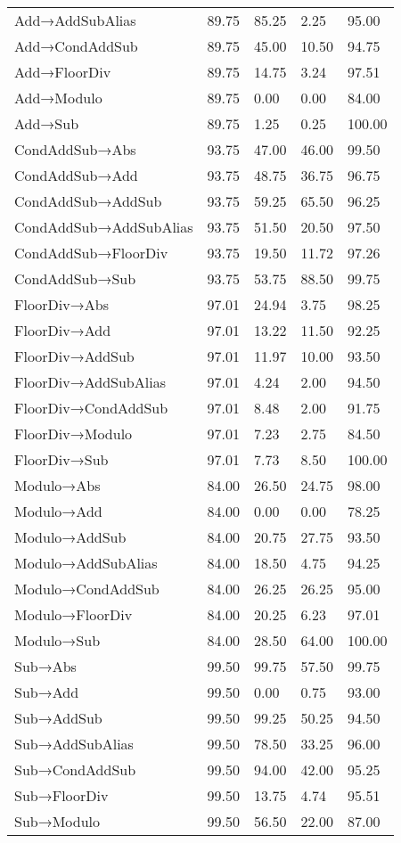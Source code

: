\begin{longtable}{lllll}
Add→AddSubAlias & 89.75 & 85.25 & 2.25 & 95.00 \\
Add→CondAddSub & 89.75 & 45.00 & 10.50 & 94.75 \\
Add→FloorDiv & 89.75 & 14.75 & 3.24 & 97.51 \\
Add→Modulo & 89.75 & 0.00 & 0.00 & 84.00 \\
Add→Sub & 89.75 & 1.25 & 0.25 & 100.00 \\
CondAddSub→Abs & 93.75 & 47.00 & 46.00 & 99.50 \\
CondAddSub→Add & 93.75 & 48.75 & 36.75 & 96.75 \\
CondAddSub→AddSub & 93.75 & 59.25 & 65.50 & 96.25 \\
CondAddSub→AddSubAlias & 93.75 & 51.50 & 20.50 & 97.50 \\
CondAddSub→FloorDiv & 93.75 & 19.50 & 11.72 & 97.26 \\
CondAddSub→Sub & 93.75 & 53.75 & 88.50 & 99.75 \\
FloorDiv→Abs & 97.01 & 24.94 & 3.75 & 98.25 \\
FloorDiv→Add & 97.01 & 13.22 & 11.50 & 92.25 \\
FloorDiv→AddSub & 97.01 & 11.97 & 10.00 & 93.50 \\
FloorDiv→AddSubAlias & 97.01 & 4.24 & 2.00 & 94.50 \\
FloorDiv→CondAddSub & 97.01 & 8.48 & 2.00 & 91.75 \\
FloorDiv→Modulo & 97.01 & 7.23 & 2.75 & 84.50 \\
FloorDiv→Sub & 97.01 & 7.73 & 8.50 & 100.00 \\
Modulo→Abs & 84.00 & 26.50 & 24.75 & 98.00 \\
Modulo→Add & 84.00 & 0.00 & 0.00 & 78.25 \\
Modulo→AddSub & 84.00 & 20.75 & 27.75 & 93.50 \\
Modulo→AddSubAlias & 84.00 & 18.50 & 4.75 & 94.25 \\
Modulo→CondAddSub & 84.00 & 26.25 & 26.25 & 95.00 \\
Modulo→FloorDiv & 84.00 & 20.25 & 6.23 & 97.01 \\
Modulo→Sub & 84.00 & 28.50 & 64.00 & 100.00 \\
Sub→Abs & 99.50 & 99.75 & 57.50 & 99.75 \\
Sub→Add & 99.50 & 0.00 & 0.75 & 93.00 \\
Sub→AddSub & 99.50 & 99.25 & 50.25 & 94.50 \\
Sub→AddSubAlias & 99.50 & 78.50 & 33.25 & 96.00 \\
Sub→CondAddSub & 99.50 & 94.00 & 42.00 & 95.25 \\
Sub→FloorDiv & 99.50 & 13.75 & 4.74 & 95.51 \\
Sub→Modulo & 99.50 & 56.50 & 22.00 & 87.00 \\
\end{longtable}
